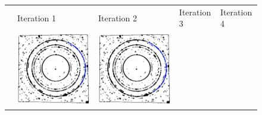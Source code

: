 \documentclass[preprint]{iucr}              %
\begin{document}
\begin{figure}
\centering

\begin{tabular}{>{\centering\arraybackslash}m{.12\linewidth} >{\centering\arraybackslash}m{.19\linewidth} >{\centering\arraybackslash}m{.19\linewidth} >{\centering\arraybackslash}m{.19\linewidth} >{\centering\arraybackslash}m{.19\linewidth}}

&Iteration 1 & Iteration 2 & Iteration 3 & Iteration 4
\\
{\color{blue}Region}&
\includegraphics[width=\linewidth]{Detail/o_Si12_0002_R_2_0.png}&
\includegraphics[width=\linewidth]{Detail/o_Si12_0002_R_2_1.png}&

\end{tabular}
\end{figure}
\end{document}
